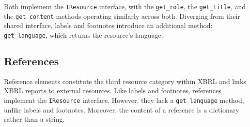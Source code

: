 Both implement the \texttt{IResource} interface,
with the \texttt{get\_role}, the \texttt{get\_title}, and the \texttt{get\_content} methods operating similarly across both.
Diverging from their shared interface, labels and footnotes introduce an additional method: \texttt{get\_language},
which returns the resource's language.

\subsection{References}


Reference elements constitute the third resource category within XBRL
and links XBRL reports to external resources.
Like labels and footnotes, references implement the \texttt{IResource} interface.
However, they lack a \texttt{get\_language} method, unlike labels and footnotes.
Moreover, the content of a reference is a dictionary rather than a string.
